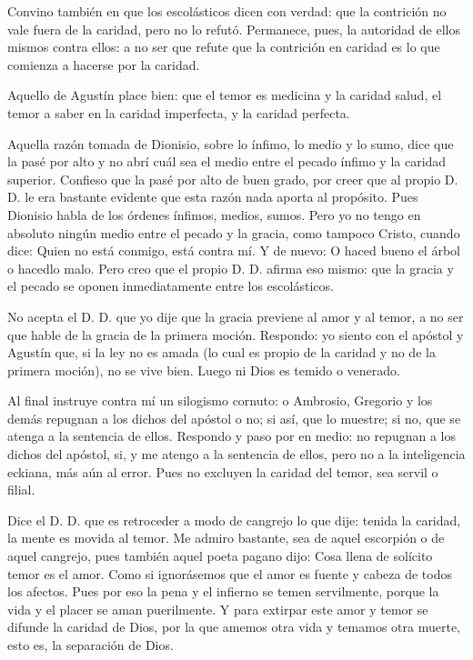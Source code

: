 Convino también en que los escolásticos dicen con verdad: que la contrición no vale fuera de la caridad, pero no lo refutó. Permanece, pues, la autoridad de ellos mismos contra ellos: a no ser que refute que la contrición en caridad es lo que comienza a hacerse por la caridad.

Aquello de Agustín place bien: que el temor es medicina y la caridad salud, el temor a saber en la caridad imperfecta, y la caridad perfecta.

Aquella razón tomada de Dionisio, sobre lo ínfimo, lo medio y lo sumo, dice que la pasé por alto y no abrí cuál sea el medio entre el pecado ínfimo y la caridad superior. Confieso que la pasé por alto de buen grado, por creer que al propio D. D. le era bastante evidente que esta razón nada aporta al propósito. Pues Dionisio habla de los órdenes ínfimos, medios, sumos. Pero yo no tengo en absoluto ningún medio entre el pecado y la gracia, como tampoco Cristo, cuando dice: Quien no está conmigo, está contra mí. Y de nuevo: O haced bueno el árbol o hacedlo malo. Pero creo que el propio D. D. afirma eso mismo: que la gracia y el pecado se oponen inmediatamente entre los escolásticos.

No acepta el D. D. que yo dije que la gracia previene al amor y al temor, a no ser que hable de la gracia de la primera moción. Respondo: yo siento con el apóstol y Agustín que, si la ley no es amada (lo cual es propio de la caridad y no de la primera moción), no se vive bien. Luego ni Dios es temido o venerado.

\marginpar{\small[372]} Al final instruye contra mí un silogismo cornuto: o Ambrosio, Gregorio y los demás repugnan a los dichos del apóstol o no; si así, que lo muestre; si no, que se atenga a la sentencia de ellos. Respondo y paso por en medio: no repugnan a los dichos del apóstol, si, y me atengo a la sentencia de ellos, pero no a la inteligencia eckiana, más aún al error. Pues no excluyen la caridad del temor, sea servil o filial.

Dice el D. D. que es retroceder a modo de cangrejo lo que dije: tenida la caridad, la mente es movida al temor. Me admiro bastante, sea de aquel escorpión o de aquel cangrejo, pues también aquel poeta pagano dijo: Cosa llena de solícito temor es el amor. Como si ignorásemos que el amor es fuente y cabeza de todos los afectos. Pues por eso la pena y el infierno se temen servilmente, porque la vida y el placer se aman puerilmente. Y para extirpar este amor y temor se difunde la caridad de Dios, por la que amemos otra vida y temamos otra muerte, esto es, la separación de Dios.

